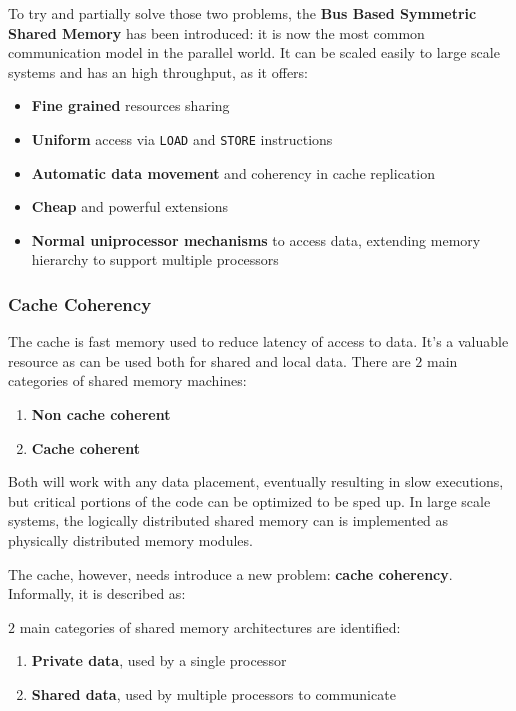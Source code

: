 \documentclass[english]{article}
\begin{document}
To try and partially solve those two problems, the \textbf{Bus Based Symmetric Shared Memory} has been introduced:
it is now the most common communication model in the parallel world.
It can be scaled easily to large scale systems and has an high throughput, as it offers:

\begin{itemize}
  \item \textbf{Fine grained} resources sharing
  \item \textbf{Uniform} access via \texttt{LOAD} and \texttt{STORE} instructions
  \item \textbf{Automatic data movement} and coherency in cache replication
  \item \textbf{Cheap} and powerful extensions
  \item \textbf{Normal uniprocessor mechanisms} to access data, extending memory hierarchy to support multiple processors
\end{itemize}

\subsubsection{Cache Coherency}

The cache is fast memory used to reduce latency of access to data.
It's a valuable resource as can be used both for shared and local data.
There are \(2\) main categories of shared memory machines:

\begin{enumerate}
  \item \textbf{Non cache coherent}
  \item \textbf{Cache coherent}
\end{enumerate}

Both will work with any data placement, eventually resulting in slow executions, but critical portions of the code can be optimized to be sped up.
In large scale systems, the logically distributed shared memory can is implemented as physically distributed memory modules.

The cache, however, needs introduce a new problem: \textbf{cache coherency}.
Informally, it is described as:


\bigskip
\(2\) main categories of shared memory architectures are identified:

\begin{enumerate}
  \item \textbf{Private data}, used by a single processor
  \item \textbf{Shared data}, used by multiple processors to communicate
\end{enumerate}
\end{document}
